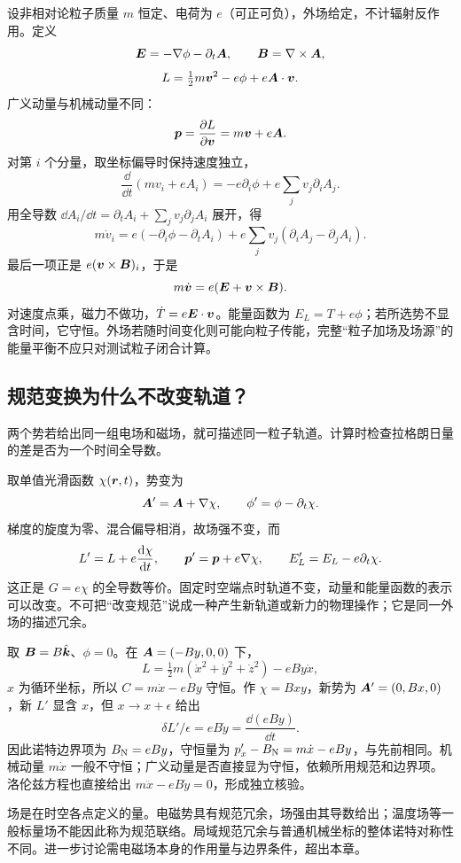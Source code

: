 设非相对论粒子质量 $m$ 恒定、电荷为 $e$（可正可负），外场给定，不计辐射反作用。定义
\[
\boldsymbol{E}=-\nabla\phi-\partial_t\boldsymbol{A},\qquad \boldsymbol{B}=\nabla\times\boldsymbol{A},
\]
\begin{equation}\label{eq:em-lagrangian}
L=\tfrac12m\boldsymbol{v}^2-e\phi+e\boldsymbol{A}\cdot\boldsymbol{v}.
\end{equation}
广义动量与机械动量不同：
\begin{equation}\label{eq:canonical-momentum-em}
\boldsymbol{p}=\frac{\partial L}{\partial\boldsymbol{v}}=m\boldsymbol{v}+e\boldsymbol{A}.
\end{equation}
对第 $i$ 个分量，取坐标偏导时保持速度独立，
\[
\frac{\dd}{\dd t}(mv_i+eA_i)=-e\partial_i\phi+e\sum_j v_j\partial_i A_j.
\]
用全导数 $\dd A_i/\dd t=\partial_t A_i+\sum_jv_j\partial_jA_i$ 展开，得
\[
m\dot v_i=e(-\partial_i\phi-\partial_tA_i)
+e\sum_jv_j(\partial_iA_j-\partial_jA_i).
\]
最后一项正是 $e(\boldsymbol{v}\times\boldsymbol{B})_i$，于是
\begin{equation}\label{eq:lag-lorentz-force}
m\dot{\boldsymbol{v}}=e(\boldsymbol{E}+\boldsymbol{v}\times\boldsymbol{B}).
\end{equation}
对速度点乘，磁力不做功，$\dot T=e\boldsymbol{E}\cdot\boldsymbol{v}$。能量函数为 $E_L=T+e\phi$；若所选势不显含时间，它守恒。外场若随时间变化则可能向粒子传能，完整“粒子加场及场源”的能量平衡不应只对测试粒子闭合计算。

\subsection{规范变换为什么不改变轨道？}
两个势若给出同一组电场和磁场，就可描述同一粒子轨道。计算时检查拉格朗日量的差是否为一个时间全导数。

取单值光滑函数 $\chi(\boldsymbol{r},t)$，势变为
\begin{equation}\label{eq:gauge-transform}
\boldsymbol{A}'=\boldsymbol{A}+\nabla\chi,\qquad \phi'=\phi-\partial_t\chi.
\end{equation}
梯度的旋度为零、混合偏导相消，故场强不变，而
\[
L'=L+e\frac{\mathrm{d}\chi}{\mathrm{d} t},\qquad
\boldsymbol{p}'=\boldsymbol{p}+e\nabla\chi,\qquad E_L'=E_L-e\partial_t\chi.
\]
这正是 $G=e\chi$ 的全导数等价。固定时空端点时轨道不变，动量和能量函数的表示可以改变。不可把“改变规范”说成一种产生新轨道或新力的物理操作；它是同一外场的描述冗余。

\begin{example}
取 $\boldsymbol{B}=B\hat{\boldsymbol{k}}$、$\phi=0$。在 $\boldsymbol{A}=(-By,0,0)$ 下，
\[
L=\tfrac12m(\dot x^2+\dot y^2+\dot z^2)-eBy\dot x,
\]
$x$ 为循环坐标，所以 $C=m\dot x-eBy$ 守恒。作 $\chi=Bxy$，新势为 $\boldsymbol{A}'=(0,Bx,0)$，新 $L'$ 显含 $x$，但 $x\to x+\epsilon$ 给出
\[
\delta L'/\epsilon=eB\dot y=\frac{\dd(eBy)}{\dd t}.
\]
因此诺特边界项为 $B_{\rm N}=eBy$，守恒量为 $p'_x-B_{\rm N}=m\dot x-eBy$，与先前相同。机械动量 $m\dot x$ 一般不守恒；广义动量是否直接显为守恒，依赖所用规范和边界项。洛伦兹方程也直接给出 $m\ddot x-eB\dot y=0$，形成独立核验。
\end{example}
\begin{modernbox}[title={进一步探索：从势到场，而非把所有场都叫规范场}]
场是在时空各点定义的量。电磁势具有规范冗余，场强由其导数给出；温度场等一般标量场不能因此称为规范联络。局域规范冗余与普通机械坐标的整体诺特对称性不同。进一步讨论需电磁场本身的作用量与边界条件，超出本章。
\end{modernbox}

